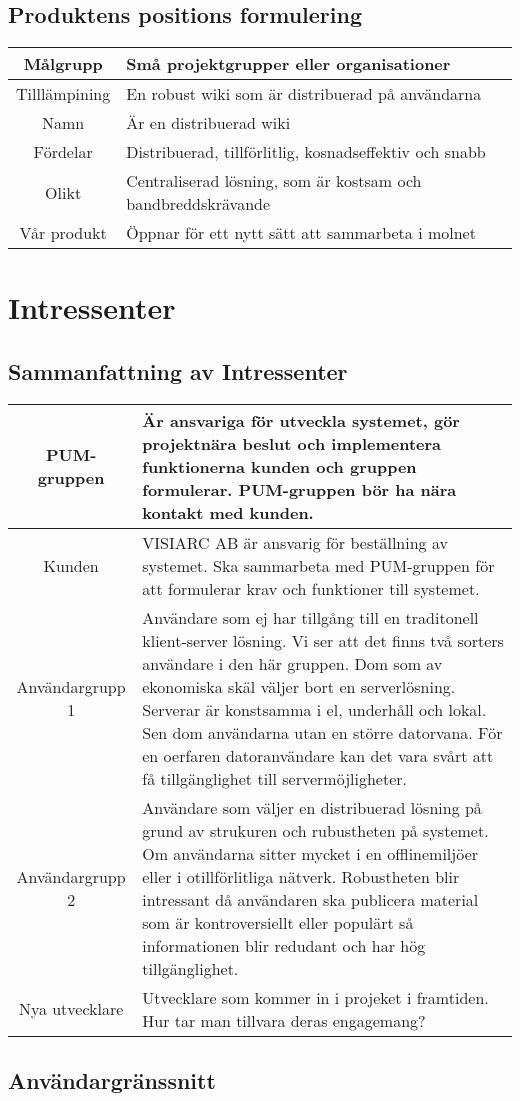 \subsection{Produktens positions formulering} %
\begin{tabular}{|c|m{15 cm}|}
\hline
Målgrupp & Små projektgrupper eller organisationer\\
\hline
Tilllämpining & En robust wiki som är distribuerad på användarna \\
\hline
Namn & Är en distribuerad wiki  \\
\hline 
Fördelar & Distribuerad, tillförlitlig, kosnadseffektiv och snabb \\
\hline
Olikt & Centraliserad lösning, som är kostsam och bandbreddskrävande\\
\hline
Vår produkt & Öppnar för ett nytt sätt att sammarbeta i molnet \\
\hline
\end{tabular}
\section{Intressenter}
\subsection{Sammanfattning av Intressenter}
\begin{tabular}{|c|m{14 cm}|}
 \hline
PUM-gruppen & Är ansvariga för utveckla systemet, gör projektnära beslut och implementera funktionerna kunden och gruppen formulerar.  PUM-gruppen bör ha nära kontakt med kunden. \\ \hline
Kunden & VISIARC AB är ansvarig för beställning av systemet. Ska sammarbeta med PUM-gruppen för att formulerar krav och funktioner till systemet. \\ \hline
Användargrupp 1 & Användare som ej har tillgång till en traditonell klient-server lösning. Vi ser att det finns två sorters användare i den här gruppen. Dom som av ekonomiska skäl väljer bort en serverlösning. Serverar är konstsamma i el, underhåll och lokal. Sen dom användarna utan en större datorvana. För en oerfaren datoranvändare kan det vara svårt att få tillgänglighet till servermöjligheter. \\ \hline
Användargrupp 2 & Användare som väljer en distribuerad lösning på grund av strukuren och rubustheten på systemet. Om användarna sitter mycket i en offlinemiljöer eller i otillförlitliga nätverk. Robustheten blir intressant då användaren ska publicera material som är kontroversiellt eller populärt så informationen blir redudant och har hög tillgänglighet.\\ \hline
Nya utvecklare & Utvecklare som kommer in i projeket i framtiden. Hur tar man tillvara deras engagemang?\\ \hline
\end{tabular}
\subsection{Användargränssnitt}


